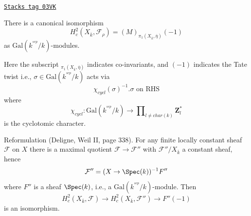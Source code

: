 \begin{lemma}[Identify h2c]
\label{trace-lemma-identify-h2c}
\href{https://stacks.math.columbia.edu/tag/03VK}{\texttt{Stacks tag 03VK}}

There is a canonical isomorphism
$$
H_c^2(X_{\overline{k}}, \mathcal{F}_\rho)=(M)_{\pi_1(X_{\overline{k}},
\overline\eta)}(-1)
$$
as $\text{Gal}(k^{^{sep}}/k)$-modules.
\end{lemma}

Here the subscript ${}_{\pi_1(X_{\overline{k}}, \overline\eta)}$
indicates co-invariants, and $(-1)$ indicates the Tate twist i.e.,
$\sigma\in \text{Gal}(k^{^{sep}}/k)$ acts via
$$
\chi_{cycl}(\sigma)^{-1}.\sigma\text{ on RHS}
$$
where
$$
\chi_{cycl} :
\text{Gal}(k^{^{sep}}/k)
\to
\prod\nolimits_{l\neq char(k)}\mathbf{Z}_l^*
$$
is the cyclotomic character.

\medskip\noindent
Reformulation (Deligne, Weil II, page 338). For any finite locally
constant sheaf $\mathcal{F}$ on $X$ there is a maximal quotient $\mathcal{F}\to
\mathcal{F}''$ with $\mathcal{F}''/X_{\overline{k}}$ a constant sheaf, hence
$$
\mathcal{F}'' = (X\to \Spec(k))^{-1}F''
$$
where $F''$ is a sheaf $\Spec(k)$, i.e., a
$\text{Gal}(k^{^{sep}}/k)$-module. Then
$$
H_c^2(X_{\overline{k}}, \mathcal{F})\to H_c^2(X_{\overline{k}},
\mathcal{F}'')\to F''(-1)
$$
is an isomorphism.

